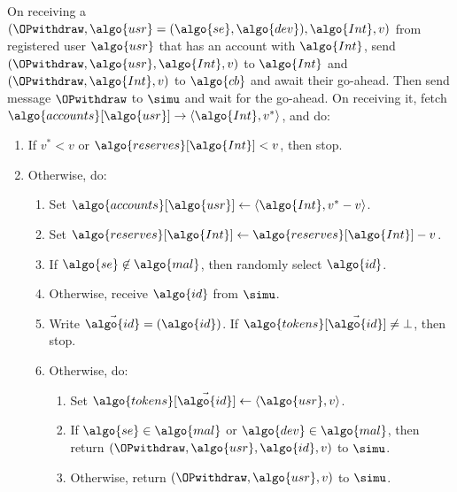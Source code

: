 \begin{framed}
\begin{enumerate}
	\end{enumerate}

	\fuinterface{\OPwithdraw} On receiving a $(\OPwithdraw, \algo{usr} = (\algo{se},
\algo{dev}), \algo{Int}, v)$ from registered user $\algo{usr}$ that has an
account with $\algo{Int}$, send $(\OPwithdraw, \algo{usr}, \algo{Int}, v)$ to
$\algo{Int}$ and $(\OPwithdraw, \algo{Int}, v)$ to $\algo{cb}$ and await their
go-ahead. Then send message $\OPwithdraw$ to $\simu$ and wait for the go-ahead.
On receiving it, fetch $\algo{accounts}[\algo{usr}] \rightarrow \langle
\algo{Int}, v^*\rangle$, and do:

	\begin{enumerate}

	  \item If $v^* < v$ or  $\algo{reserves}[\algo{Int}] < v$, then stop.

	  \item Otherwise, do:

	    \begin{enumerate}

	      \item Set $\algo{accounts}[\algo{usr}] \leftarrow \langle
\algo{Int}, v^* - v\rangle$.

	      \item Set $\algo{reserves}[\algo{Int}] \leftarrow
\algo{reserves}[\algo{Int}] - v$.

	      \item If $\algo{se} \not\in \algo{mal}$, then randomly select
$\algo{id}$.

	      \item Otherwise, receive $\algo{id}$ from $\simu$.

	      \item Write $\vec{\algo{id}} = (\algo{id})$. If $\algo{tokens}[\vec{\algo{id}}]
\neq \bot$, then stop.

	      \item Otherwise, do:

		\begin{enumerate}

		  \item Set $\algo{tokens}[\vec{\algo{id}}] \gets \langle \algo{usr},
v \rangle$.

		  \item If $\algo{se} \in \algo{mal}$ or $\algo{dev} \in
\algo{mal}$, then return $(\OPwithdraw, \algo{usr}, \algo{id}, v)$ to $\simu$.

		  \item Otherwise, return $(\OPwithdraw,\allowbreak \algo{usr},\allowbreak v)$ to
$\simu$.


\end{enumerate}
\end{enumerate}
\end{enumerate}
\end{framed}

